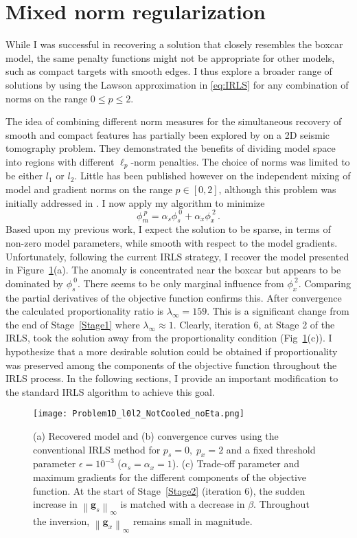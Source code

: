 \section{Mixed norm regularization}
While I was successful in recovering a solution that closely resembles the boxcar model, the same penalty functions might not be appropriate for other models, such as compact targets with smooth edges. I thus explore a broader range of solutions by using the Lawson approximation in \eqref{eq:IRLS} for any combination of norms on the range $0 \leq p \leq 2$.

The idea of combining different norm measures for the simultaneous recovery of smooth and compact features has partially been explored by \cite{SunLi14} on a 2D seismic tomography problem. They demonstrated the benefits of dividing model space into regions with different $\ell_p$-norm penalties. The choice of norms was limited to be either $l_1$ or $l_2$.
Little has been published however on the independent mixing of model and gradient norms on the range $p \in [0,2]$, although this problem was initially addressed in \cite[]{Fournier2015}.
I now apply my algorithm to minimize
\begin{equation}\label{mixNorm}
\phi_m^{\:p} = \alpha_s \phi_s^{\:0} + \alpha_x \phi_x^{\:2}\,.
\end{equation}
Based upon my previous work, I expect the solution to be sparse, in terms of non-zero model parameters, while smooth with respect to the model gradients.
Unfortunately, following the current IRLS strategy, I recover the model presented in Figure~\ref{Mixed1DnoEta}(a). The anomaly is concentrated near the boxcar but appears to be dominated by $\phi_s^{\:0}$. There seems to be only marginal influence from $\phi_x^{\:2}$.
Comparing the partial derivatives of the objective function confirms this. After convergence the calculated proportionality ratio is $\lambda_\infty = 159$.
This is a significant change from the end of Stage~\ref{Stage1} where $\lambda_\infty \approx 1$. Clearly, iteration 6, at Stage 2 of the IRLS, took the solution away from the proportionality condition (Fig~\ref{Mixed1DnoEta}(c)).
I hypothesize that a more desirable solution could be obtained if proportionality was preserved among the components of the objective function throughout the IRLS process. In the following sections, I provide an important modification to the standard IRLS algorithm to achieve this goal.
\begin{figure}
\texttt{[image: Problem1D\_l0l2\_NotCooled\_noEta.png]}
\caption{(a) Recovered model and (b) convergence curves using the conventional IRLS method for $p_s=0,\;p_x=2$ and a fixed threshold parameter $\epsilon=10^{-3}$ ($\alpha_s=\alpha_x=1$). (c) Trade-off parameter and maximum gradients for the different components of the objective function. At the start of Stage~\ref{Stage2} (iteration 6), the sudden increase in $\left\| \mathbf{g}_s \right\|_\infty$ is matched with a decrease in $\beta$. Throughout the inversion, $\left\| \mathbf{g}_x \right\|_\infty$ remains small in magnitude.
}
\label{Mixed1DnoEta}
\end{figure}



